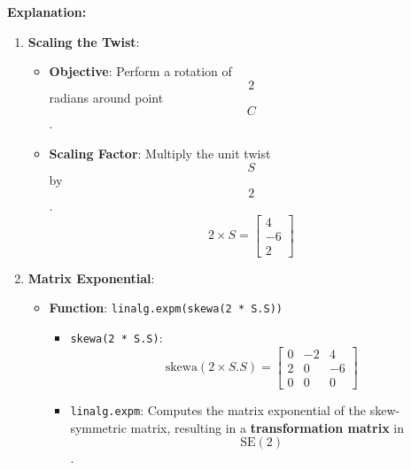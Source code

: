 \documentclass[12pt]{article}
\begin{document}
\textbf{Explanation:}

\begin{enumerate}
    \item \textbf{Scaling the Twist}:
        \begin{itemize}
            \item \textbf{Objective}: Perform a rotation of $$ 2 $$ radians around point $$ C $$.
            \item \textbf{Scaling Factor}: Multiply the unit twist $$ S $$ by $$ 2 $$.
            $$
            2 \times S = 
            \begin{bmatrix}
            4 \\
            -6 \\
            2 
            \end{bmatrix}
            $$
        \end{itemize}
    
    \item \textbf{Matrix Exponential}:
        \begin{itemize}
            \item \textbf{Function}: \texttt{linalg.expm(skewa(2 * S.S))}
                \begin{itemize}
                    \item \texttt{skewa(2 * S.S)}:
                        $$
                        \text{skewa}(2 \times S.S) = 
                        \begin{bmatrix}
                        0 & -2 & 4 \\
                        2 & 0 & -6 \\
                        0 & 0 & 0 
                        \end{bmatrix}
                        $$
                    \item \texttt{linalg.expm}: Computes the matrix exponential of the skew-symmetric matrix, resulting in a \textbf{transformation matrix} in $$\text{SE}(2)$$.
                \end{itemize}
        \end{itemize}
    

\end{enumerate}
\end{document}
